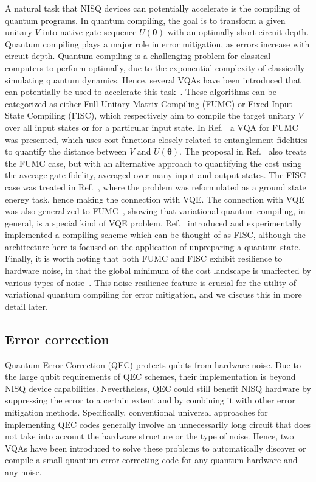 \documentclass[prx,twocolumn,floatfix,superscriptaddress,longbibliography]{revtex4-1}
\renewcommand{\vec}[1]{\boldsymbol{#1}}  %
\newcommand{\<}{\langle}
\renewcommand{\>}{\rangle}
\renewcommand{\vec}[1]{\boldsymbol{#1}}  %
\begin{document}
A natural task that NISQ devices can potentially accelerate is the compiling of quantum programs. In quantum compiling, the goal is to transform a given unitary $V$ into native gate sequence $U(\vec{\theta})$ with an optimally short circuit depth. Quantum compiling plays a major role in error mitigation, as errors increase with circuit depth. Quantum compiling is a challenging problem for classical computers to perform optimally, due to the exponential complexity of classically simulating quantum dynamics. Hence, several VQAs have been introduced  that can potentially be used to accelerate this task~\cite{QAQC,heya2018variational,jones2018quantum,sharma2019noise,carolan2020variational}. These algorithms can be categorized as either Full Unitary Matrix Compiling (FUMC) or Fixed Input State Compiling (FISC), which respectively aim to compile the target unitary $V$ over all input states or for a particular input state. In Ref.~\cite{QAQC} a VQA for FUMC was presented, which uses  cost functions closely related to entanglement fidelities to quantify the distance between $V$ and $U(\vec{\theta})$. The proposal in Ref.~\cite{heya2018variational} also treats the FUMC case, but with an alternative approach to quantifying the cost using the average gate fidelity, averaged over many input and output states. The FISC case was treated in Ref.~\cite{jones2018quantum}, where the problem was reformulated as a ground state energy task, hence making the connection with VQE. The connection with VQE was also generalized to FUMC~\cite{sharma2019noise}, showing that variational quantum compiling, in general, is a special kind of VQE problem. Ref.~\cite{carolan2020variational} introduced and experimentally implemented a compiling scheme which can be thought of as FISC, although the architecture here is  focused on the application of unpreparing a quantum state. Finally, it is worth noting that  both FUMC and FISC exhibit resilience to hardware noise, in that the global minimum of the cost landscape is unaffected by various types of noise~\cite{sharma2019noise}. This noise resilience feature is crucial for the utility of variational quantum compiling for error mitigation, and we discuss this in more detail later.




\subsection{ Error correction}
Quantum Error Correction (QEC) protects qubits from hardware noise. Due to the large qubit requirements of QEC schemes, their implementation is beyond NISQ device capabilities. 
Nevertheless, QEC could still benefit NISQ hardware by suppressing the error to a certain extent and by combining it with other error mitigation methods. Specifically, conventional universal approaches for implementing QEC codes generally involve an unnecessarily long circuit that does not take into account the hardware structure or the type of noise. Hence, two VQAs have been introduced to solve these problems to automatically discover or compile a small quantum error-correcting code for any quantum hardware and any noise. 
    
\end{document}
